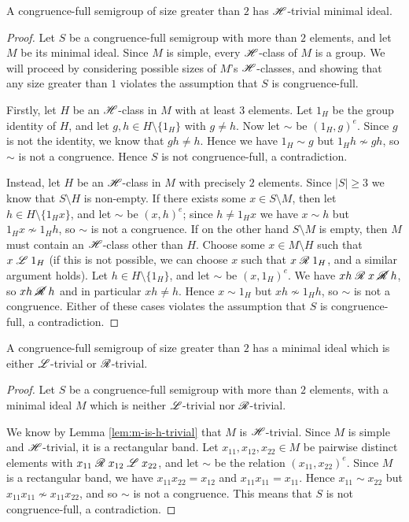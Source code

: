 \begin{lemma}
  \label{lem:m-is-h-trivial}
  A congruence-full semigroup of size greater than $2$ has $\mathrel{\mathscr{H}}$-trivial
  minimal ideal.
  \begin{proof}
    Let $S$ be a congruence-full semigroup with more than $2$ elements, and let
    $M$ be its minimal ideal.  Since $M$ is simple, every $\mathrel{\mathscr{H}}$-class of $M$ is
    a group.  We will proceed by considering possible sizes of $M$'s
    $\mathrel{\mathscr{H}}$-classes, and showing that any size greater than $1$ violates the
    assumption that $S$ is congruence-full.

    Firstly, let $H$ be an $\mathrel{\mathscr{H}}$-class in $M$ with at least $3$ elements.  Let
    $1_H$ be the group identity of $H$, and let $g,h \in H\setminus\{1_H\}$
    with $g \neq h$.  Now let $\sim$ be $(1_H, g)^e$.  Since $g$ is not the
    identity, we know that $gh \neq h$.  Hence we have $1_H \sim g$ but
    $1_H h \nsim gh$, so $\sim$ is not a congruence.  Hence $S$ is not
    congruence-full, a contradiction.

    Instead, let $H$ be an $\mathrel{\mathscr{H}}$-class in $M$ with precisely $2$ elements.
    Since $|S| \geq 3$ we know that $S \setminus H$ is non-empty.  If there
    exists some $x \in S \setminus M$, then let $h \in H \setminus \{1_H x\}$,
    and let $\sim$ be $(x,h)^e$; since $h \neq 1_H x$ we have $x \sim h$ but
    $1_H x \nsim 1_H h$, so $\sim$ is not a congruence.  If on the other hand
    $S \setminus M$ is empty, then $M$ must contain an $\mathrel{\mathscr{H}}$-class other than
    $H$.  Choose some $x \in M \setminus H$ such that $x \mathrel{\mathscr{L}} 1_H$ (if this is
    not possible, we can choose $x$ such that $x \mathrel{\mathscr{R}} 1_H$, and a similar
    argument holds).  Let $h \in H \setminus \{1_H\}$, and let $\sim$ be
    $(x,1_H)^e$.  We have $xh \mathrel{\mathscr{R}} x \mathrel{\cancel{\mathscr{R}}} h$, so $xh \mathrel{\cancel{\mathscr{R}}} h$ and in particular
    $xh \neq h$.  Hence $x \sim 1_H$ but $xh \nsim 1_H h$, so $\sim$ is
    not a congruence.  Either of these cases violates the assumption that $S$
    is congruence-full, a contradiction.
  \end{proof}
\end{lemma}

\begin{lemma}
  \label{lem:m-is-l-or-r-trivial}
  A congruence-full semigroup of size greater than $2$ has a minimal ideal which
  is either $\mathrel{\mathscr{L}}$-trivial or $\mathrel{\mathscr{R}}$-trivial.
  \begin{proof}
    Let $S$ be a congruence-full semigroup with more than $2$ elements, with a
    minimal ideal $M$ which is neither $\mathrel{\mathscr{L}}$-trivial nor $\mathrel{\mathscr{R}}$-trivial.

    We know by Lemma \ref{lem:m-is-h-trivial} that $M$ is $\mathrel{\mathscr{H}}$-trivial.
    Since $M$ is simple and $\mathrel{\mathscr{H}}$-trivial, it is a rectangular band.  Let
    $x_{11}, x_{12}, x_{22} \in M$ be pairwise distinct elements with
    $x_{11} \mathrel{\mathscr{R}} x_{12} \mathrel{\mathscr{L}} x_{22}$, and let $\sim$ be the relation
    $(x_{11},x_{22})^e$.  Since $M$ is a rectangular band, we have
    $x_{11}x_{22} = x_{12}$ and $x_{11}x_{11} = x_{11}$.  Hence
    $x_{11} \sim x_{22}$ but $x_{11}x_{11} \nsim x_{11}x_{22}$, and so $\sim$ is
    not a congruence.  This means that $S$ is not congruence-full, a
    contradiction.
  \end{proof}
\end{lemma}

